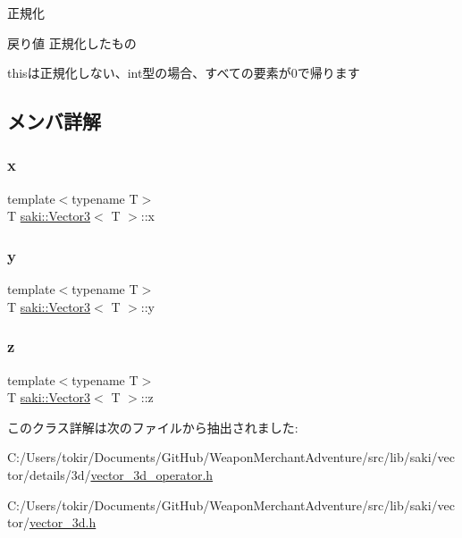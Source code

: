 正規化 

\begin{DoxyReturn}{戻り値}
正規化したもの
\end{DoxyReturn}
thisは正規化しない、int型の場合、すべての要素が0で帰ります 

\subsection{メンバ詳解}
\mbox{\label{classsaki_1_1_vector3_a1fa58e9e75dbeb650afb3db740f3131c}} 
\subsubsection{\texorpdfstring{x}{x}}
{\footnotesize\ttfamily template$<$typename T$>$ \\
T \mbox{\hyperlink{classsaki_1_1_vector3}{saki\+::\+Vector3}}$<$ T $>$\+::x}

\mbox{\label{classsaki_1_1_vector3_aba41be4543769bd023387691acf654dd}} 
\subsubsection{\texorpdfstring{y}{y}}
{\footnotesize\ttfamily template$<$typename T$>$ \\
T \mbox{\hyperlink{classsaki_1_1_vector3}{saki\+::\+Vector3}}$<$ T $>$\+::y}

\mbox{\label{classsaki_1_1_vector3_abb4ddf92f66d05e965fbd17ab3e655ff}} 
\subsubsection{\texorpdfstring{z}{z}}
{\footnotesize\ttfamily template$<$typename T$>$ \\
T \mbox{\hyperlink{classsaki_1_1_vector3}{saki\+::\+Vector3}}$<$ T $>$\+::z}



このクラス詳解は次のファイルから抽出されました\+:\begin{DoxyCompactItemize}
\item 
C\+:/\+Users/tokir/\+Documents/\+Git\+Hub/\+Weapon\+Merchant\+Adventure/src/lib/saki/vector/details/3d/\mbox{\hyperlink{vector__3d__operator_8h}{vector\+\_\+3d\+\_\+operator.\+h}}\item 
C\+:/\+Users/tokir/\+Documents/\+Git\+Hub/\+Weapon\+Merchant\+Adventure/src/lib/saki/vector/\mbox{\hyperlink{vector__3d_8h}{vector\+\_\+3d.\+h}}\end{DoxyCompactItemize}
